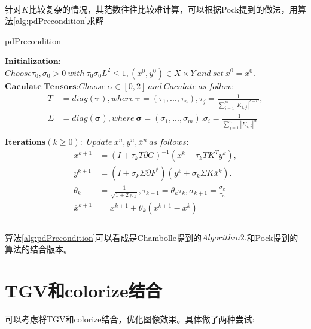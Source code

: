 \documentclass[UTF8]{ctexart}
\newcommand{\myciteup}[1]{\textsuperscript{\textsuperscript{\cite{#1}}}}
\begin{document}
\begin{sloppypar}
    针对$K$比较复杂的情况，其范数往往比较难计算，可以根据Pock\myciteup{Diagonal_preconditioning}提到的做法，用算法\ref{alg:pdPrecondition}求解
    \begin{algorithm}
        \caption{pdPrecondition}
        \begin{algorithmic}
            \STATE $\bm{Initialization}$: $Choose \tau_0,\sigma_0 >0\ with\ \tau_0\sigma_{0}L^2\leq 1, (x^0,y^0)\in X\times Y \ and \ set\ \overline{x}^0=x^0.$
            \STATE $\bm{Caculate\ Tensors}$:$Choose\ \alpha \in[0,2]\ and\ Caculate\ as\ follow:$
            \begin{equation}
                \begin{aligned}
            T &= diag(\bm{\tau}) , where\ \bm{\tau} = (\tau_1,...,\tau_n),\tau_j=\frac{1}{\sum_{i=1}^m\left| K_{i,j} \right|^{2-\alpha}},\\
            \Sigma &= diag(\bm{\sigma}),where\ \bm{\sigma} = (\sigma_1,...,\sigma_m).\sigma_i=\frac{1}{\sum_{j=1}^n\left| K_{i,j} \right|^{\alpha}}\\
                \end{aligned}
            \end{equation}
        \STATE $\bm{Iterations}(k\geq 0)$:\ $Update\ x^n,y^n,\overline{x}^n\ as\ follows:$
            \begin{equation}
                \begin{aligned}
                    x^{k+1} &=(I+\tau_k T\partial G)^{-1}(x^k-\tau_k TK^Ty^k ), \\
                    y^{k+1} &=(I+\sigma_k\Sigma\partial F^*)(y^k+\sigma_k \Sigma K\overline{x}^k).\\
                    \theta_k &= \frac{1}{\sqrt {1+2\gamma \tau_k}},\tau_{k+1}=\theta_k\tau_k,\sigma_{k+1}=\frac{\sigma_k}{\tau_n}\\
                    \overline{x}^{k+1} &= x^{k+1}+\theta_k(x^{k+1}-x^k)\\
                \end{aligned}
            \end{equation}
        \end{algorithmic}
        \label{alg:pdPrecondition}
    \end{algorithm}
    算法\ref{alg:pdPrecondition}可以看成是Chambolle\myciteup{Chambolle2011}提到的$Algorithm 2.$和Pock\myciteup{Diagonal_preconditioning}提到的算法的结合版本。\par
\section{TGV和colorize结合}
    可以考虑将TGV和colorize结合，优化图像效果。具体做了两种尝试:\par

\end{sloppypar}
\end{document}
